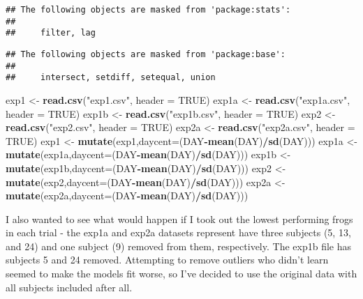 \documentclass[]{article}
\newenvironment{Shaded}{\begin{snugshade}}{\end{snugshade}}
\newcommand{\KeywordTok}[1]{\textcolor[rgb]{0.13,0.29,0.53}{\textbf{#1}}}
\newcommand{\DataTypeTok}[1]{\textcolor[rgb]{0.13,0.29,0.53}{#1}}
\newcommand{\StringTok}[1]{\textcolor[rgb]{0.31,0.60,0.02}{#1}}
\newcommand{\OtherTok}[1]{\textcolor[rgb]{0.56,0.35,0.01}{#1}}
\newcommand{\OperatorTok}[1]{\textcolor[rgb]{0.81,0.36,0.00}{\textbf{#1}}}
\newcommand{\NormalTok}[1]{#1}
\begin{document}
\begin{verbatim}
## The following objects are masked from 'package:stats':
## 
##     filter, lag
\end{verbatim}

\begin{verbatim}
## The following objects are masked from 'package:base':
## 
##     intersect, setdiff, setequal, union
\end{verbatim}

\begin{Shaded}
\begin{Highlighting}[]
\NormalTok{exp1 <-}\StringTok{ }\KeywordTok{read.csv}\NormalTok{(}\StringTok{"exp1.csv"}\NormalTok{, }\DataTypeTok{header =} \OtherTok{TRUE}\NormalTok{)}
\NormalTok{exp1a <-}\StringTok{ }\KeywordTok{read.csv}\NormalTok{(}\StringTok{"exp1a.csv"}\NormalTok{, }\DataTypeTok{header =} \OtherTok{TRUE}\NormalTok{)}
\NormalTok{exp1b <-}\StringTok{ }\KeywordTok{read.csv}\NormalTok{(}\StringTok{"exp1b.csv"}\NormalTok{, }\DataTypeTok{header =} \OtherTok{TRUE}\NormalTok{)}
\NormalTok{exp2 <-}\StringTok{ }\KeywordTok{read.csv}\NormalTok{(}\StringTok{"exp2.csv"}\NormalTok{, }\DataTypeTok{header =} \OtherTok{TRUE}\NormalTok{)}
\NormalTok{exp2a <-}\StringTok{ }\KeywordTok{read.csv}\NormalTok{(}\StringTok{"exp2a.csv"}\NormalTok{, }\DataTypeTok{header =} \OtherTok{TRUE}\NormalTok{)}
\NormalTok{exp1 <-}\StringTok{ }\KeywordTok{mutate}\NormalTok{(exp1,}\DataTypeTok{daycent=}\NormalTok{(DAY}\OperatorTok{-}\KeywordTok{mean}\NormalTok{(DAY)}\OperatorTok{/}\KeywordTok{sd}\NormalTok{(DAY)))}
\NormalTok{exp1a <-}\StringTok{ }\KeywordTok{mutate}\NormalTok{(exp1a,}\DataTypeTok{daycent=}\NormalTok{(DAY}\OperatorTok{-}\KeywordTok{mean}\NormalTok{(DAY)}\OperatorTok{/}\KeywordTok{sd}\NormalTok{(DAY)))}
\NormalTok{exp1b <-}\StringTok{ }\KeywordTok{mutate}\NormalTok{(exp1b,}\DataTypeTok{daycent=}\NormalTok{(DAY}\OperatorTok{-}\KeywordTok{mean}\NormalTok{(DAY)}\OperatorTok{/}\KeywordTok{sd}\NormalTok{(DAY)))}
\NormalTok{exp2 <-}\StringTok{ }\KeywordTok{mutate}\NormalTok{(exp2,}\DataTypeTok{daycent=}\NormalTok{(DAY}\OperatorTok{-}\KeywordTok{mean}\NormalTok{(DAY)}\OperatorTok{/}\KeywordTok{sd}\NormalTok{(DAY)))}
\NormalTok{exp2a <-}\StringTok{ }\KeywordTok{mutate}\NormalTok{(exp2a,}\DataTypeTok{daycent=}\NormalTok{(DAY}\OperatorTok{-}\KeywordTok{mean}\NormalTok{(DAY)}\OperatorTok{/}\KeywordTok{sd}\NormalTok{(DAY)))}
\end{Highlighting}
\end{Shaded}

I also wanted to see what would happen if I took out the lowest
performing frogs in each trial - the exp1a and exp2a datasets represent
have three subjects (5, 13, and 24) and one subject (9) removed from
them, respectively. The exp1b file has subjects 5 and 24 removed.
Attempting to remove outliers who didn't learn seemed to make the models
fit worse, so I've decided to use the original data with all subjects
included after all.
\end{document}
